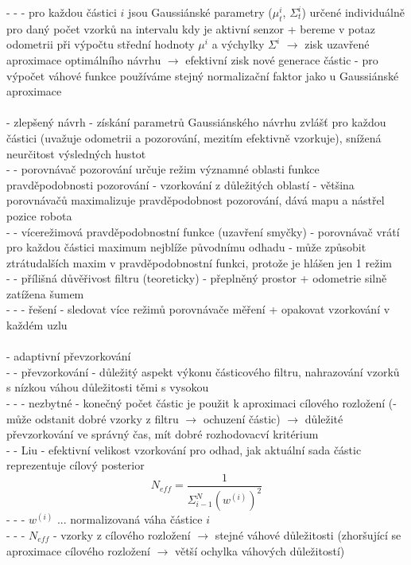 \documentclass[11pt]{article}
\begin{document}
- - - pro každou částici $i$ jsou Gaussiánské parametry ($\mu_t^i$, $\Sigma_t^i$) určené individuálně pro daný počet vzorků na intervalu kdy je aktivní senzor + bereme v potaz odometrii při výpočtu střední hodnoty $\mu^i$ a výchylky $\Sigma^i$ $\rightarrow$ zisk uzavřené aproximace optimálního návrhu $\rightarrow$ efektivní zisk nové generace částic - pro výpočet váhové funkce používáme stejný normalizační faktor jako u Gaussiánské aproximace\\
\\
- zlepšený návrh - získání parametrů Gaussiánského návrhu zvlášť pro každou částici (uvažuje odometrii a pozorování, mezitím efektivně vzorkuje), snížená neurčitost výsledných hustot\\
- - porovnávač pozorování určuje režim významné oblasti funkce pravděpodobnosti pozorování - vzorkování z důležitých oblastí - většina porovnávačů maximalizuje pravděpodobnost pozorování, dává mapu a nástřel pozice robota\\
- - vícerežimová pravděpodobnostní funkce (uzavření smyčky) - porovnávač vrátí pro každou částici maximum nejblíže původnímu odhadu - může způsobit ztrátudalších maxim v pravděpodobnostní funkci, protože je hlášen jen 1 režim\\
- - přílišná důvěřivost filtru (teoreticky) - přeplněný prostor + odometrie silně zatížena šumem\\
- - - řešení - sledovat více režimů porovnávače měření + opakovat vzorkování v každém uzlu\\
\\
- adaptivní převzorkování\\
- - převzorkování - důležitý aspekt výkonu částicového filtru, nahrazování vzorků s nízkou váhou důležitosti těmi s vysokou\\
- - - nezbytné - konečný počet částic je použit k aproximaci cílového rozložení (- může odstanit dobré vzorky z filtru $\rightarrow$ ochuzení částic) $\rightarrow$ důležité převzorkování ve správný čas, mít dobré rozhodovacví kritérium\\
- - Liu - efektivní velikost vzorkování pro odhad, jak aktuální sada částic reprezentuje cílový posterior\\
$$N_{eff}=\frac{1}{\varSigma_{i-1}^N(w^{(i)})^2}$$ 
- - - $w^{(i)}$ ... normalizovaná váha částice $i$ \\
- - - $N_{eff}$ - vzorky z cílového rozložení $\rightarrow$ stejné váhové důležitosti (zhoršující se aproximace cílového rozložení $\rightarrow$ větší ochylka váhových důležitostí)\\
\end{document}

